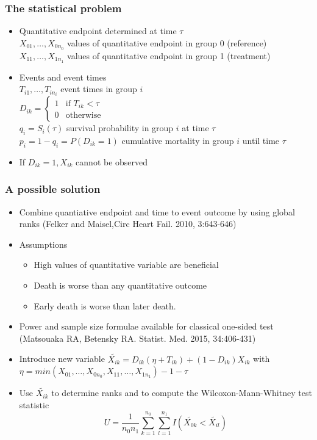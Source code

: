 \documentclass[xcolor=pdftex,dvipsnames,table]{beamer}\usepackage[]{graphicx}\usepackage[]{color}
\begin{document}
\begin{frame} %
\frametitle{The statistical problem}
	\begin{itemize}
		\item Quantitative endpoint determined at time $\tau$ \\
    $X_{01}, \ldots, X_{0n_0}$  values of quantitative endpoint in group 0 (reference)\\
    $X_{11}, \ldots, X_{1n_1}$  values of quantitative endpoint in group 1 (treatment) \\
		\item Events and event times \\
		$T_{i1}, \ldots, T_{in_i}$  event times in group $i$ \\
    $D_{ik} = \begin{cases} 1 & \mbox{if } T_{ik} < \tau \\
                            0 & \mbox{otherwise} 
              \end{cases}$ \\
		$q_i = S_i(\tau) $  survival probability in group $i$ at time $\tau$ \\
		$p_i = 1 - q_i = P(D_{ik} = 1)$  cumulative mortality in group $i$ until time $\tau$ \\
		\item If $D_{ik} = 1, X_{ik}$ cannot be observed
\end{itemize}
\end{frame}

\begin{frame} %
\frametitle{A possible solution}
	\begin{itemize}
		\item Combine quantiative endpoint and time to event outcome by using global ranks
          (Felker and Maisel,Circ Heart Fail. 2010, 3:643-646)
		\item Assumptions
		\begin{itemize} 
		  \item High values of quantitative variable are beneficial
		  \item Death is worse than any quantitative outcome
		  \item Early death is worse than later death.
	\end{itemize}
	\item Power and sample size formulae available for classical one-sided test
        (Matsouaka RA, Betensky RA. Statist. Med. 2015, 34:406-431)
	\item Introduce new variable 
	     $\tilde{X_{ik}} = D_{ik}(\eta  + T_{ik}) + (1 - D_{ik})X_{ik}$ with \\
	     $\eta = min(X_{01}, \ldots, X_{0n_0}, X_{11}, \ldots, X_{1n_1}) - 1 - \tau$
	\item Use $\tilde{X_{ik}}$ to determine ranks and to compute the Wilcoxon-Mann-Whitney test statistic \\
  $$ U = \frac{1}{n_0 n_1} \sum_{k=1}^{n_0} \sum_{l=1}^{n_1}I(\tilde{X_{0k}} < \tilde{X_{il}}) $$
\end{itemize}
\end{frame}
\end{document}
